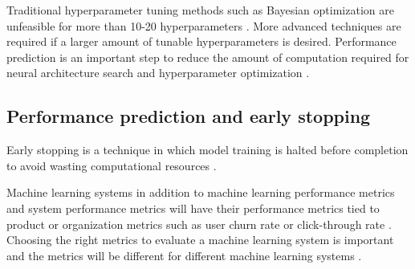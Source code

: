 Traditional hyperparameter tuning methods such as Bayesian optimization are unfeasible for more than 10-20 hyperparameters \parencite{maclaurinGradientbasedHyperparameterOptimization2015}.
More advanced techniques are required if a larger amount of tunable hyperparameters is desired.
Performance prediction is an important step to reduce the amount of computation required for neural architecture search and hyperparameter optimization \parencite{bakerAcceleratingNeuralArchitecture2017}.

\subsection{Performance prediction and early stopping}

Early stopping is a technique in which model training is halted before completion to avoid wasting computational resources \parencite{precheltAutomaticEarlyStopping1998}.

Machine learning systems in addition to machine learning performance metrics and system performance metrics will have their performance metrics tied to product or organization metrics such as user churn rate or click-through rate \parencite{shankarOperationalizingMachineLearning2022}. Choosing the right metrics to evaluate a machine learning system is important and the metrics will be different for different machine learning systems \parencite{shankarOperationalizingMachineLearning2022}.